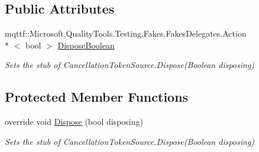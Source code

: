 \subsection*{Public Attributes}
\begin{DoxyCompactItemize}
\item 
mqttf\-::\-Microsoft.\-Quality\-Tools.\-Testing.\-Fakes.\-Fakes\-Delegates.\-Action\\*
$<$ bool $>$ \hyperlink{class_system_1_1_threading_1_1_fakes_1_1_stub_cancellation_token_source_a98e820f161a796bc49fc116fd7576563}{Dispose\-Boolean}
\begin{DoxyCompactList}\small\item\em Sets the stub of Cancellation\-Token\-Source.\-Dispose(\-Boolean disposing)\end{DoxyCompactList}\end{DoxyCompactItemize}
\subsection*{Protected Member Functions}
\begin{DoxyCompactItemize}
\item 
override void \hyperlink{class_system_1_1_threading_1_1_fakes_1_1_stub_cancellation_token_source_ab59c0e86cc92396692e22cd70dcc9291}{Dispose} (bool disposing)
\begin{DoxyCompactList}\small\item\em Sets the stub of Cancellation\-Token\-Source.\-Dispose(\-Boolean disposing)\end{DoxyCompactList}\end{DoxyCompactItemize}
